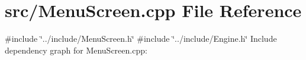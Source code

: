 \section{src/\-Menu\-Screen.cpp \-File \-Reference}
\label{_menu_screen_8cpp}
{\ttfamily \#include \char`\"{}../include/\-Menu\-Screen.\-h\char`\"{}}\*
{\ttfamily \#include \char`\"{}../include/\-Engine.\-h\char`\"{}}\*
\-Include dependency graph for \-Menu\-Screen.\-cpp\-:
